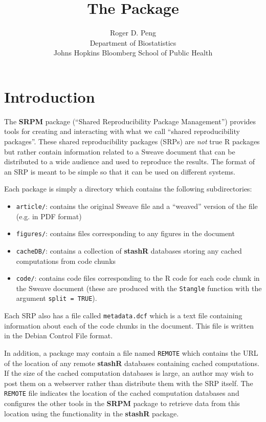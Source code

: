 \documentclass{article}
\author{Roger D. Peng\\Department of Biostatistics\\Johns Hopkins Bloomberg School of Public Health}
\title{The \pkg{SRPM} Package}
\newcommand{\proglang}{\textsf}
\newcommand{\code}{\texttt}
\newcommand{\pkg}{\textbf}
\begin{document}

\maketitle

\section{Introduction}

The \pkg{SRPM} package (``Shared Reproducibility Package Management'')
provides tools for creating and interacting with what we call ``shared
reproducibility packages''.  These shared reproducibility packages
(SRPs) are \textit{not} true \proglang{R} packages but rather contain
information related to a Sweave document that can be distributed to a
wide audience and used to reproduce the results.  The format of an SRP
is meant to be simple so that it can be used on different systems.

Each package is simply a directory which contains the following
subdirectories:
\begin{itemize}
\item
\code{article/}: contains the original Sweave file and a ``weaved''
version of the file (e.g. in PDF format)
\item
\code{figures/}: contains files corresponding to any figures in the
document
\item
\code{cacheDB/}: contains a collection of \pkg{stashR} databases
storing any cached computations from code chunks
\item
\code{code/}: contains code files corresponding to the \proglang{R}
code for each code chunk in the Sweave document (these are produced
with the \code{Stangle} function with the argument \code{split =
TRUE}).
\end{itemize}
Each SRP also has a file called \code{metadata.dcf} which is a text
file containing information about each of the code chunks in the
document.  This file is written in the Debian Control File format.

In addition, a package may contain a file named \code{REMOTE} which
contains the URL of the location of any remote \pkg{stashR} databases
containing cached computations.  If the size of the cached computation
databases is large, an author may wish to post them on a webserver
rather than distribute them with the SRP itself.  The \code{REMOTE}
file indicates the location of the cached computation databases and
configures the other tools in the \pkg{SRPM} package to retrieve data
from this location using the functionality in the \pkg{stashR}
package.
\end{document}
